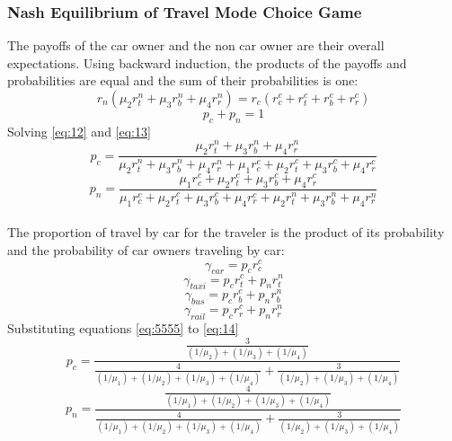 \subsubsection{Nash Equilibrium of Travel Mode Choice Game}
The payoffs of the car owner and the non car owner are their overall expectations. Using backward induction, the products of the payoffs and probabilities are equal and the sum of their probabilities is one: 
\begin{equation}\label{eq:12}
r_n(\mu_2 r^n_{t} + \mu_3 r^n_{b} + \mu_4 r^n_{r}) =  r_c(r^c_{c} + r^{c}_{t} + r^c_{b} + r^c_{r})
\end{equation}
\begin{equation}\label{eq:13}
p_c + p_n = 1
\end{equation}
Solving \ref{eq:12} and \ref{eq:13}
\begin{equation}
p_c = \frac{\mu_2 r^n_{t} + \mu_3 r^n_{b} + \mu_4 r^n_{r}}{\mu_2 r^n_{t} + \mu_3 r^n_{b} + \mu_4 r^n_{r} + \mu_1 r^c_{c} +  \mu_2 r^{c}_{t} + \mu_3 r^c_{b} + \mu_4 r^c_{r}}
\end{equation}
\begin{equation}
p_n = \frac{\mu_1 r^c_{c} +  \mu_2 r^{c}_{t} + \mu_3 r^c_{b} + \mu_4 r^c_{r}}{\mu_1 r^c_{c} +  \mu_2 r^{c}_{t} + \mu_3 r^c_{b} + \mu_4 r^c_{r} + \mu_2 r^n_{t} + \mu_3 r^n_{b} + \mu_4 r^n_{r}}
\end{equation}
\paragraph{}The proportion of travel by car for the traveler is the product of its probability and the probability of car owners traveling by car:  
\begin{equation}\label{eq:14}
\gamma_{car} = p_c r^c_c
\end{equation}
\begin{equation}
\gamma_{taxi} = p_c r^c_t + p_n r^n_t
\end{equation}
\begin{equation}
\gamma_{bus} = p_c r^c_b + p_n r^n_b
\end{equation}
\begin{equation}\label{eq:15}
\gamma_{rail} = p_c r^c_r + p_n r^n_r
\end{equation}
Substituting equations \ref{eq:5555} to \ref{eq:14}
\begin{equation}
p_{c} = \frac{\frac{3}{(1/\mu_2)+(1/\mu_3)+(1/\mu_4)}}{\frac{4}{(1/\mu_1)+(1/\mu_2)+(1/\mu_3)+(1/\mu_4)}+\frac{3}{(1/\mu_2)+(1/\mu_3)+(1/\mu_4)}}
\end{equation}
\begin{equation}
p_n{} = \frac{\frac{4}{(1/\mu_1)+(1/\mu_2)+(1/\mu_3)+(1/\mu_4)}}{\frac{4}{(1/\mu_1)+(1/\mu_2)+(1/\mu_3)+(1/\mu_4)}+\frac{3}{(1/\mu_2)+(1/\mu_3)+(1/\mu_4)}}
\end{equation}
